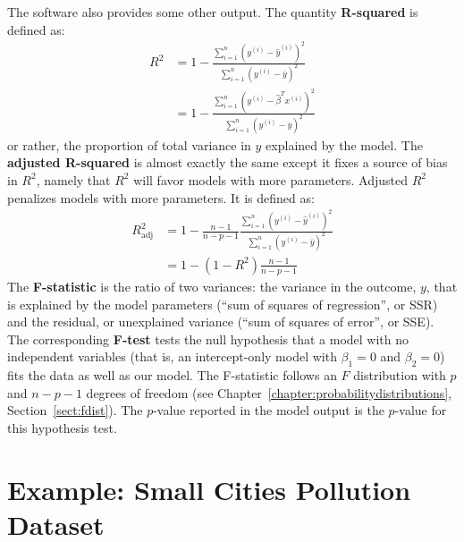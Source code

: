 The software also provides some other output. The quantity \textbf{R-squared} is defined as:
\begin{align*} R^2 &= 1 - \frac{\sum_{i=1}^n (y^{(i)} - \hat{y}^{(i)})^2}{\sum_{i=1}^n (y^{(i)} - \overline{y})^2} \\[3mm]
&=  1 - \frac{\sum_{i=1}^n (y^{(i)} - \hat{\beta}^T x^{(i)})^2}{\sum_{i=1}^n (y^{(i)} - \overline{y})^2} \end{align*}
or rather, the proportion of total variance in $y$ explained by the model. The \textbf{adjusted R-squared} is almost exactly the same except it fixes a source of bias in $R^2$, namely that $R^2$ will favor models with more parameters. Adjusted $R^2$ penalizes models with more parameters. It is defined as:
\begin{align*}
 R^2_{\text{adj}} &= 1 - \frac{n-1}{n-p-1} \frac{\sum_{i=1}^n (y^{(i)} - \hat{y}^{(i)})^2}{\sum_{i=1}^n (y^{(i)} - \overline{y})^2} \\[3mm]
 &= 1 - (1 - R^2) \frac{n-1}{n-p-1}
\end{align*}
The \textbf{F-statistic} is the ratio of two variances: the variance in the outcome, $y$, that is explained by the model parameters (``sum of squares of regression'', or SSR) and the residual, or unexplained variance (``sum of squares of error'', or SSE). The corresponding \textbf{F-test} tests the null hypothesis that a model with no independent variables (that is, an intercept-only model with $\beta_1 = 0$ and $\beta_2 = 0$) fits the data as well as our model. The F-statistic follows an $F$ distribution with $p$ and $n-p-1$ degrees of freedom (see Chapter~\ref{chapter:probabilitydistributions}, Section~\ref{sect:fdist}). The $p$-value reported in the model output is the $p$-value for this hypothesis test.  


\section{Example: Small Cities Pollution Dataset}

